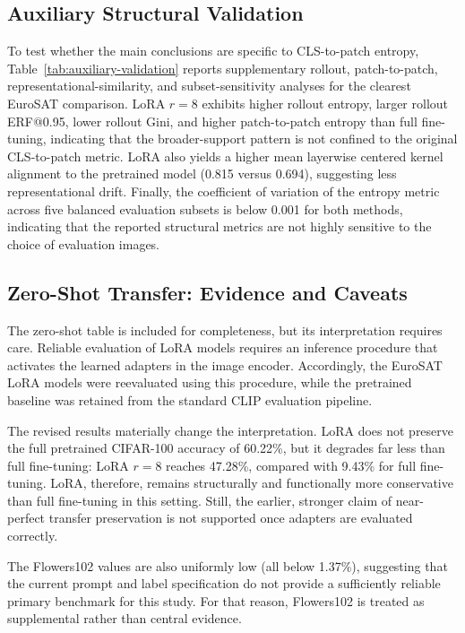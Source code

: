 \documentclass[ai,article,submit,pdftex,oneauthor]{Definitions/mdpi}
\begin{document}
\subsection{Auxiliary Structural Validation}
To test whether the main conclusions are specific to CLS-to-patch entropy, Table~\ref{tab:auxiliary-validation} reports supplementary rollout, patch-to-patch, representational-similarity, and subset-sensitivity analyses for the clearest EuroSAT comparison. LoRA $r = 8$ exhibits higher rollout entropy, larger rollout ERF@0.95, lower rollout Gini, and higher patch-to-patch entropy than full fine-tuning, indicating that the broader-support pattern is not confined to the original CLS-to-patch metric. LoRA also yields a higher mean layerwise centered kernel alignment to the pretrained model (0.815 versus 0.694), suggesting less representational drift. Finally, the coefficient of variation of the entropy metric across five balanced evaluation subsets is below 0.001 for both methods, indicating that the reported structural metrics are not highly sensitive to the choice of evaluation images.



\subsection{Zero-Shot Transfer: Evidence and Caveats}
The zero-shot table is included for completeness, but its interpretation requires care. Reliable evaluation of LoRA models requires an inference procedure that activates the learned adapters in the image encoder. Accordingly, the EuroSAT LoRA models were reevaluated using this procedure, while the pretrained baseline was retained from the standard CLIP evaluation pipeline.



The revised results materially change the interpretation. LoRA does not preserve the full pretrained CIFAR-100 accuracy of 60.22\%, but it degrades far less than full fine-tuning: LoRA $r = 8$ reaches 47.28\%, compared with 9.43\% for full fine-tuning. LoRA, therefore, remains structurally and functionally more conservative than full fine-tuning in this setting. Still, the earlier, stronger claim of near-perfect transfer preservation is not supported once adapters are evaluated correctly.

The Flowers102 values are also uniformly low (all below 1.37\%), suggesting that the current prompt and label specification do not provide a sufficiently reliable primary benchmark for this study. For that reason, Flowers102 is treated as supplemental rather than central evidence.
\end{document}
